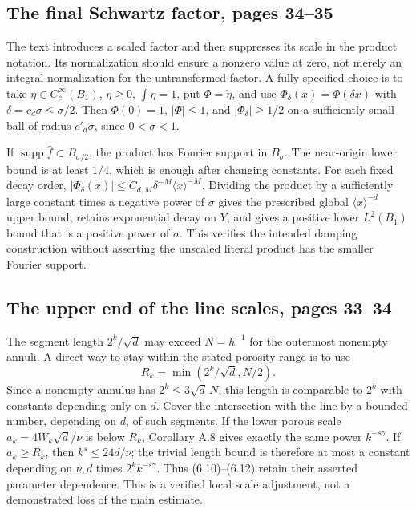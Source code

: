 \documentclass[10pt]{article}
\begin{document}
\subsection*{The final Schwartz factor, pages 34–35}
The text introduces a scaled factor and then suppresses its scale in the product notation. Its normalization should ensure a nonzero value at zero, not merely an integral normalization for the untransformed factor. A fully specified choice is to take \(\eta\in C_c^\infty(B_1)\), \(\eta\geq0\), \(\int\eta=1\), put \(\Phi=\check\eta\), and use \(\Phi_\delta(x)=\Phi(\delta x)\) with \(\delta=c_d\sigma\leq\sigma/2\). Then \(\Phi(0)=1\), \(|\Phi|\leq1\), and \(|\Phi_\delta|\geq1/2\) on a sufficiently small ball of radius \(c'_d\sigma\), since \(0<\sigma<1\).\par
If \(\operatorname{supp}\widehat f\subset B_{\sigma/2}\), the product has Fourier support in \(B_\sigma\). The near-origin lower bound is at least \(1/4\), which is enough after changing constants. For each fixed decay order, \(|\Phi_\delta(x)|\leq C_{d,M}\delta^{-M}\langle x\rangle^{-M}\). Dividing the product by a sufficiently large constant times a negative power of \(\sigma\) gives the prescribed global \(\langle x\rangle^{-d}\) upper bound, retains exponential decay on \(Y\), and gives a positive lower \(L^2(B_1)\) bound that is a positive power of \(\sigma\). This verifies the intended damping construction without asserting the unscaled literal product has the smaller Fourier support.\par
\subsection*{The upper end of the line scales, pages 33–34}
The segment length \(2^k/\sqrt d\) may exceed \(N=h^{-1}\) for the outermost nonempty annuli. A direct way to stay within the stated porosity range is to use \[R_k=\min(2^k/\sqrt d,N/2).\] Since a nonempty annulus has \(2^k\leq3\sqrt d\,N\), this length is comparable to \(2^k\) with constants depending only on \(d\). Cover the intersection with the line by a bounded number, depending on \(d\), of such segments. If the lower porous scale \(a_k=4W_k\sqrt d/\nu\) is below \(R_k\), Corollary A.8 gives exactly the same power \(k^{-s\gamma}\). If \(a_k\geq R_k\), then \(k^s\leq24d/\nu\); the trivial length bound is therefore at most a constant depending on \(\nu,d\) times \(2^k k^{-s\gamma}\). Thus (6.10)–(6.12) retain their asserted parameter dependence. This is a verified local scale adjustment, not a demonstrated loss of the main estimate.\par
\end{document}
